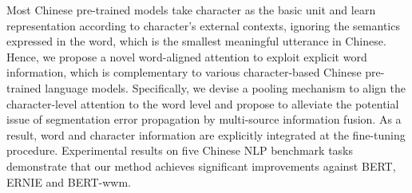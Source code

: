Most Chinese pre-trained models take character as the basic unit and learn representation according to character's external contexts, ignoring the semantics expressed in the word, which is the smallest meaningful utterance in Chinese. Hence, we propose a novel word-aligned attention to exploit explicit word information, which is complementary to various character-based Chinese pre-trained language models. Specifically, we devise a pooling mechanism to align the character-level attention to the word level and propose to alleviate the potential issue of segmentation error propagation by multi-source information fusion. As a result, word and character information are explicitly integrated at the fine-tuning procedure. Experimental results on five Chinese NLP benchmark tasks demonstrate that our method achieves significant improvements against BERT, ERNIE and BERT-wwm.
